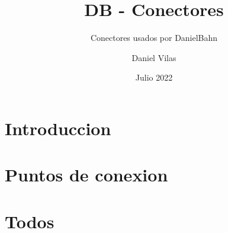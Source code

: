 \documentclass[spanish]{DccDiyTools}
\title{DB - Conectores}
\subtitle{Conectores usados por DanielBahn}
\author{Daniel Vilas}
\date{Julio 2022}
\begin{document}
\maketitle
\section{Introduccion}

\newpage
\section{Puntos de conexion}



\newpage
\section{Todos}

\end{document}
